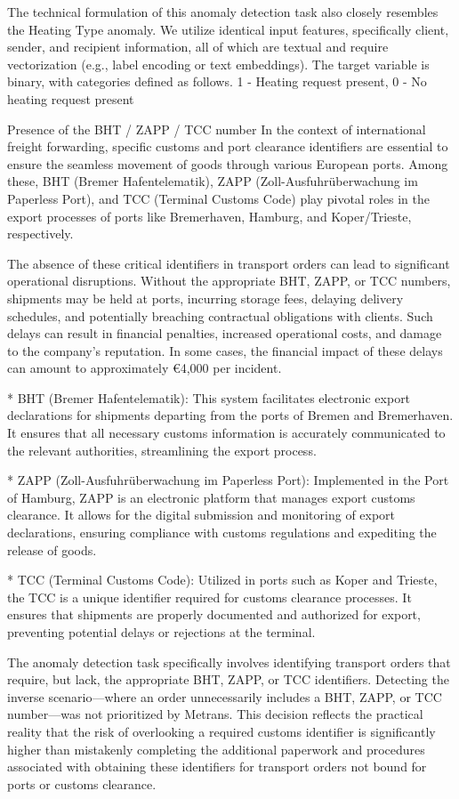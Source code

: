 The technical formulation of this anomaly detection task also closely resembles the Heating Type anomaly. We utilize identical input features, specifically client, sender, and recipient information, all of which are textual and require vectorization (e.g., label encoding or text embeddings). The target variable is binary, with categories defined as follows. 1 - Heating request present, 0 - No heating request present

\sec Presence of the BHT / ZAPP / TCC number
In the context of international freight forwarding, specific customs and port clearance identifiers are essential to ensure the seamless movement of goods through various European ports. Among these, BHT (Bremer Hafentelematik), ZAPP (Zoll-Ausfuhrüberwachung im Paperless Port), and TCC (Terminal Customs Code) play pivotal roles in the export processes of ports like Bremerhaven, Hamburg, and Koper/Trieste, respectively.

The absence of these critical identifiers in transport orders can lead to significant operational disruptions. Without the appropriate BHT, ZAPP, or TCC numbers, shipments may be held at ports, incurring storage fees, delaying delivery schedules, and potentially breaching contractual obligations with clients. Such delays can result in financial penalties, increased operational costs, and damage to the company's reputation. In some cases, the financial impact of these delays can amount to approximately €4,000 per incident.

\begitems
* BHT (Bremer Hafentelematik): This system facilitates electronic export declarations for shipments departing from the ports of Bremen and Bremerhaven. It ensures that all necessary customs information is accurately communicated to the relevant authorities, streamlining the export process. 

* ZAPP (Zoll-Ausfuhrüberwachung im Paperless Port): Implemented in the Port of Hamburg, ZAPP is an electronic platform that manages export customs clearance. It allows for the digital submission and monitoring of export declarations, ensuring compliance with customs regulations and expediting the release of goods. 

* TCC (Terminal Customs Code): Utilized in ports such as Koper and Trieste, the TCC is a unique identifier required for customs clearance processes. It ensures that shipments are properly documented and authorized for export, preventing potential delays or rejections at the terminal. 
\enditems

The anomaly detection task specifically involves identifying transport orders that require, but lack, the appropriate BHT, ZAPP, or TCC identifiers. Detecting the inverse scenario—where an order unnecessarily includes a BHT, ZAPP, or TCC number—was not prioritized by Metrans. This decision reflects the practical reality that the risk of overlooking a required customs identifier is significantly higher than mistakenly completing the additional paperwork and procedures associated with obtaining these identifiers for transport orders not bound for ports or customs clearance.

